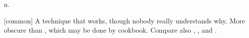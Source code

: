  n.

[common] A technique that works, though nobody really understands why. More
obscure than , which may be done by cookbook.
Compare also , , and .

